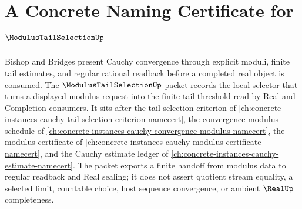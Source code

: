 \chapter{A Concrete Naming Certificate for $\ModulusTailSelectionUp$}
\label{ch:concrete-instances-modulus-tail-selection-namecert}

Bishop and Bridges present Cauchy convergence through explicit moduli, finite tail estimates, and regular rational readback before a completed real object is consumed. The $\ModulusTailSelectionUp$ packet records the local selector that turns a displayed modulus request into the finite tail threshold read by Real and Completion consumers. It sits after the tail-selection criterion of \autoref{ch:concrete-instances-cauchy-tail-selection-criterion-namecert}, the convergence-modulus schedule of \autoref{ch:concrete-instances-cauchy-convergence-modulus-namecert}, the modulus certificate of \autoref{ch:concrete-instances-cauchy-modulus-certificate-namecert}, and the Cauchy estimate ledger of \autoref{ch:concrete-instances-cauchy-estimate-namecert}. The packet exports a finite handoff from modulus data to regular readback and Real sealing; it does not assert quotient stream equality, a selected limit, countable choice, host sequence convergence, or ambient $\RealUp$ completeness.

